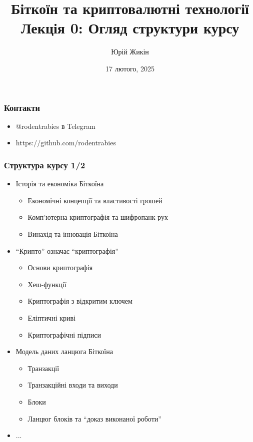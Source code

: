 \documentclass{beamer}
\title{
  Біткоїн та криптовалютні технології \\
  Лекція 0: Огляд структури курсу
}
\author{Юрій Жикін}
\date{17 лютого, 2025}
\begin{document}
\frame{\titlepage}

\begin{frame}
  \frametitle{Контакти}
  \begin{itemize}
  \item @rodentrabies в Telegram
  \item https://github.com/rodentrabies
  \end{itemize}
\end{frame}

\begin{frame}
  \frametitle{Структура курсу 1/2}
  \begin{itemize}
  \item Історія та економіка Біткоїна
    \begin{itemize}
    \item Економічні концепції та властивості грошей
    \item Комп'ютерна криптографія та шифропанк-рух
    \item Винахід та інновація Біткоїна
    \end{itemize}
  \item ``Крипто'' означає ``криптографія''
    \begin{itemize}
    \item Основи криптографія
    \item Хеш-функції
    \item Криптографія з відкритим ключем
    \item Еліптичні криві
    \item Криптографічні підписи
    \end{itemize}
  \item Модель даних ланцюга Біткоїна
    \begin{itemize}
    \item Транзакції
    \item Транзакційні входи та виходи
    \item Блоки
    \item Ланцюг блоків та ``доказ виконаної роботи''
    \end{itemize}
  \item[] ...
  \end{itemize}
\end{frame}
\end{document}
